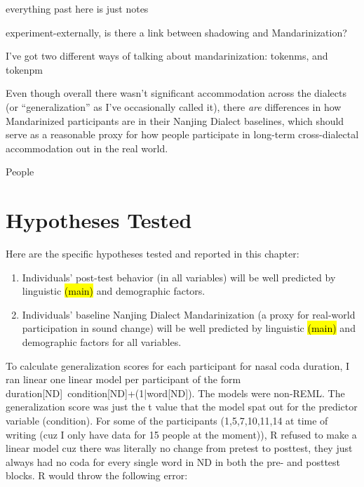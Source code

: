 \pagebreak
everything past here is just notes
\pagebreak

experiment-externally, is there a link between shadowing and Mandarinization?

I've got two different ways of talking about mandarinization: tokenms, and tokenpm

Even though overall there wasn't significant accommodation across the dialects (or ``generalization'' as I've occasionally called it), there \textit{are} differences in how Mandarinized participants are in their Nanjing Dialect baselines, which should serve as a reasonable proxy for how people participate in long-term cross-dialectal accommodation out in the real world.

People 

\section{Hypotheses Tested}
\label{sec:externalHypotheses}

Here are the specific hypotheses tested and reported in this chapter:

\begin{enumerate}
    \item Individuals' post-test behavior (in all variables) will be well predicted by linguistic \hl{(main)} and demographic factors.
    \item Individuals' baseline Nanjing Dialect Mandarinization (a proxy for real-world participation in sound change) will be well predicted by linguistic \hl{(main)} and demographic factors for all variables.
\end{enumerate}

To calculate generalization scores for each participant for nasal coda duration, I ran linear one linear model per participant of the form duration[ND]~condition[ND]+(1|word[ND]). %
The models were non-REML. The generalization score was just the t value that the model spat out for the predictor variable (condition). For some of the participants (1,5,7,10,11,14 at time of writing (cuz I only have data for 15 people at the moment)), R refused to make a linear model cuz there was literally no change from pretest to posttest, they just always had no coda for every single word in ND in both the pre- and posttest blocks. R would throw the following error:

